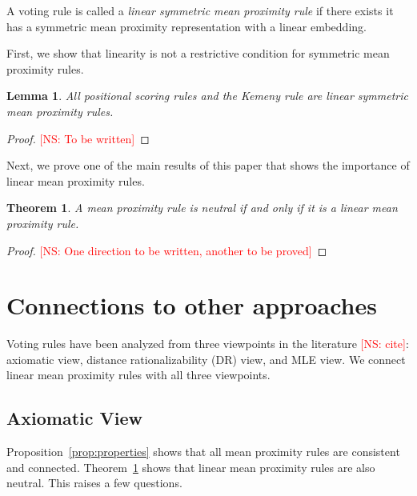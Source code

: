 \documentclass[10pt,letterpaper]{article}
\newtheorem{theorem}{Theorem}
\newtheorem{lemma}{Lemma}
\newenvironment{definition}[1][Definition]{\begin{trivlist}
\item[\hskip \labelsep {\bfseries #1}]}{\end{trivlist}}
\newcommand{\kibitz}[2]{\ifnum\Comments=1\textcolor{#1}{#2}\fi}
\newcommand{\cns}[1]{\kibitz{red} {[NS: #1]}}
\begin{document}
\begin{definition}[Linear Symmetric Mean Proximity Rule]
A voting rule is called a \emph{linear symmetric mean proximity rule} if there exists it has a symmetric mean proximity representation with a linear embedding. 
\end{definition}

First, we show that linearity is not a restrictive condition for symmetric mean proximity rules.

\begin{lemma}
All positional scoring rules and the Kemeny rule are linear symmetric mean proximity rules.
\label{lem:linear-captures}
\end{lemma}
\begin{proof}
\cns{To be written}
\end{proof}

Next, we prove one of the main results of this paper that shows the importance of linear mean proximity rules. 
\begin{theorem}
A mean proximity rule is neutral if and only if it is a linear mean proximity rule. 
\label{thm:linear-neutral}
\end{theorem}
\begin{proof}
\cns{One direction to be written, another to be proved}
\end{proof}



\section{Connections to other approaches}
Voting rules have been analyzed from three viewpoints in the literature \cns{cite}: axiomatic view, distance rationalizability (DR) view, and MLE view. We connect linear mean proximity rules with all three viewpoints.


\subsection{Axiomatic View}
Proposition~\ref{prop:properties} shows that all mean proximity rules are consistent and connected. Theorem~\ref{thm:linear-neutral} shows that linear mean proximity rules are also neutral. This raises a few questions.
\end{document}
